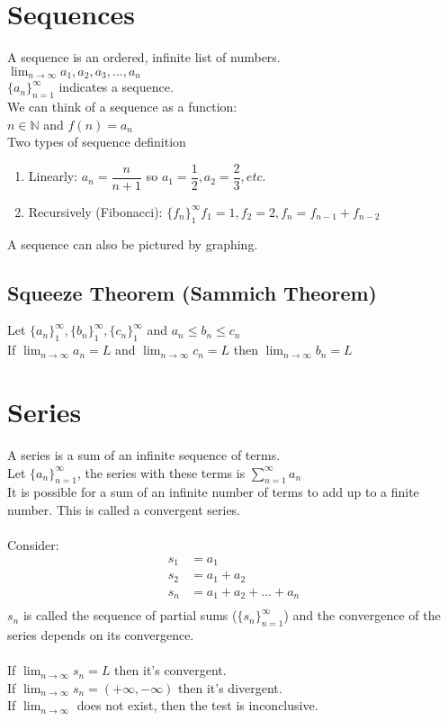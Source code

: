 \documentclass{article}
\begin{document}
\section{Sequences}
A sequence is an ordered, infinite list of numbers.\\
\indent $ \displaystyle \lim_{n \to \infty}a_1,a_2,a_3,...,a_n$\\
$\{a_n\}^\infty_{n=1}$ indicates a sequence.\\
We can think of a sequence as a function:\\
\indent $ n \in \mathbb{N} $ and $ f(n)=a_n $\\
Two types of sequence definition\\
\begin{enumerate}
\item Linearly: $ a_n=\dfrac{n}{n+1} $ so $ a_1=\dfrac{1}{2}, a_2=\dfrac{2}{3},etc. $\\
\item Recursively (Fibonacci): $\{f_n\}^\infty_1 f_1=1, f_2=2, f_n=f_{n-1}+f_{n-2} $\\
\end{enumerate}
A sequence can also be pictured by graphing.\\
\subsection*{Squeeze Theorem (Sammich Theorem)}
Let $ \{a_n\}^\infty_1,\{b_n\}^\infty_1,\{c_n\}^\infty_1 $ and $ a_n \le b_n \le c_n $\\
If $ \displaystyle \lim_{n\to\infty}a_n=L$ and $ \displaystyle \lim_{n\to\infty}c_n=L$ then $ \displaystyle \lim_{n\to\infty}b_n=L$
\section{Series}
A series is a sum of an infinite sequence of terms.\\
Let $\{a_n\}^\infty_{n=1}$, the series with these terms is $ \displaystyle \sum_{n=1}^\infty a_n $\\
It is possible for a sum of an infinite number of terms to add up to a finite number. This is called a convergent series.\\\\
Consider:\\
\begin{equation}
\begin{aligned}
s_1&=a_1\\
s_2&=a_1+a_2\\
s_n&=a_1+a_2+...+a_n\\
\end{aligned}
\end{equation}
$s_n$ is called the sequence of partial sums ($\{s_n\}^\infty_{n=1}$) and the convergence of the series depends on its convergence.\\\\
If $\displaystyle \lim_{n\to\infty}s_n=L$ then it's convergent.\\
If $\displaystyle \lim_{n\to\infty}s_n=(+\infty,-\infty)$ then it's divergent.\\
If $\displaystyle \lim_{n\to\infty}$ does not exist, then the test is inconclusive.
\end{document}
